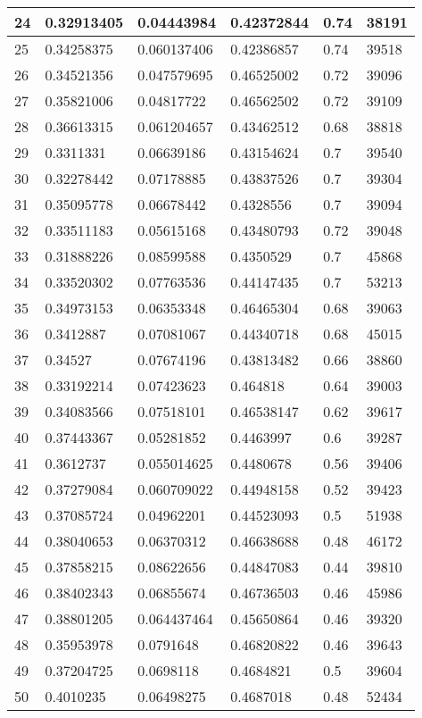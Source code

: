 \begin{longtable}{|l|l|l|l|l|l|}
24 & 0.32913405 & 0.04443984 & 0.42372844 & 0.74 & 38191 \\ \hline 
25 & 0.34258375 & 0.060137406 & 0.42386857 & 0.74 & 39518 \\ \hline 
26 & 0.34521356 & 0.047579695 & 0.46525002 & 0.72 & 39096 \\ \hline 
27 & 0.35821006 & 0.04817722 & 0.46562502 & 0.72 & 39109 \\ \hline 
28 & 0.36613315 & 0.061204657 & 0.43462512 & 0.68 & 38818 \\ \hline 
29 & 0.3311331 & 0.06639186 & 0.43154624 & 0.7 & 39540 \\ \hline 
30 & 0.32278442 & 0.07178885 & 0.43837526 & 0.7 & 39304 \\ \hline 
31 & 0.35095778 & 0.06678442 & 0.4328556 & 0.7 & 39094 \\ \hline 
32 & 0.33511183 & 0.05615168 & 0.43480793 & 0.72 & 39048 \\ \hline 
33 & 0.31888226 & 0.08599588 & 0.4350529 & 0.7 & 45868 \\ \hline 
34 & 0.33520302 & 0.07763536 & 0.44147435 & 0.7 & 53213 \\ \hline 
35 & 0.34973153 & 0.06353348 & 0.46465304 & 0.68 & 39063 \\ \hline 
36 & 0.3412887 & 0.07081067 & 0.44340718 & 0.68 & 45015 \\ \hline 
37 & 0.34527 & 0.07674196 & 0.43813482 & 0.66 & 38860 \\ \hline 
38 & 0.33192214 & 0.07423623 & 0.464818 & 0.64 & 39003 \\ \hline 
39 & 0.34083566 & 0.07518101 & 0.46538147 & 0.62 & 39617 \\ \hline 
40 & 0.37443367 & 0.05281852 & 0.4463997 & 0.6 & 39287 \\ \hline 
41 & 0.3612737 & 0.055014625 & 0.4480678 & 0.56 & 39406 \\ \hline 
42 & 0.37279084 & 0.060709022 & 0.44948158 & 0.52 & 39423 \\ \hline 
43 & 0.37085724 & 0.04962201 & 0.44523093 & 0.5 & 51938 \\ \hline 
44 & 0.38040653 & 0.06370312 & 0.46638688 & 0.48 & 46172 \\ \hline 
45 & 0.37858215 & 0.08622656 & 0.44847083 & 0.44 & 39810 \\ \hline 
46 & 0.38402343 & 0.06855674 & 0.46736503 & 0.46 & 45986 \\ \hline 
47 & 0.38801205 & 0.064437464 & 0.45650864 & 0.46 & 39320 \\ \hline 
48 & 0.35953978 & 0.0791648 & 0.46820822 & 0.46 & 39643 \\ \hline 
49 & 0.37204725 & 0.0698118 & 0.4684821 & 0.5 & 39604 \\ \hline 
50 & 0.4010235 & 0.06498275 & 0.4687018 & 0.48 & 52434 \\ \hline 
\end{longtable}